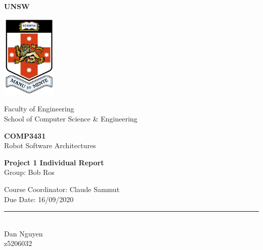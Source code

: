 \documentclass[11pt, a4, nocenter, margin=150mm]{article}
\begin{document}
\onehalfspacing
\begin{titlepage}
	\begin{center}
		\Huge
		\textbf{UNSW} \\

		\vspace{5mm}

		\includegraphics[height=4cm]{unsw-logo.jpg}

		\vspace{5mm}

		\Large
		Faculty of Engineering \\
		School of Computer Science \& Engineering \\

		\vspace{10mm}

		\textbf{COMP3431} \\
		Robot Software Architectures \\

		\vspace{15mm}

		\LARGE
		\textbf{Project 1 Individual Report} \\
		
		\Large
		Group: Bob Ros

		\vspace{15mm}

		\Large
		Course Coordinator: Claude Sammut\\
		Due Date: 16/09/2020 \\

		\vfill
		\rule{\linewidth}{0.5pt} \\

		\Large
		Dan Nguyen \\

		\large
		z5206032 \\

	\end{center}
\end{titlepage}

\tableofcontents
\vspace{1cm}
\listoffigures
\vspace{1cm}
\pagebreak
\end{document}
